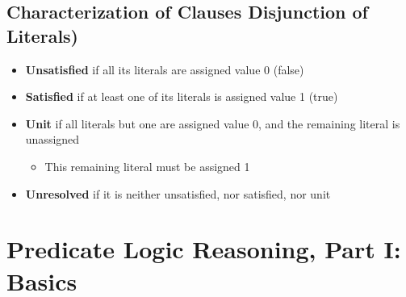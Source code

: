 \documentclass[conference]{styles/acmsiggraph}
\begin{document}
    
    \subsection{Characterization of Clauses Disjunction of Literals)}
        \begin{itemize}
            \item \textbf{Unsatisfied} if all its literals are assigned value 0 (false)
            \item \textbf{Satisfied} if at least one of its literals is assigned value 1 (true)
            \item \textbf{Unit} if all literals but one are assigned value 0, and the remaining literal is unassigned
                \begin{itemize}
                    \item This remaining literal must be assigned 1
                \end{itemize}
            \item \textbf{Unresolved} if it is neither unsatisfied, nor satisfied, nor unit
        \end{itemize}
    
    
    
    
    
    
    
    
    
    

    
    
\section{Predicate Logic Reasoning, Part I: Basics}
\end{document}
